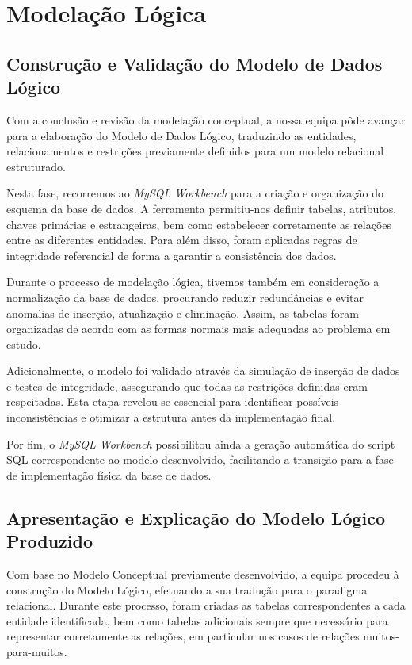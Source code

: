\documentclass[12pt,a4paper]{article}
\begin{document}
\section{Modelação Lógica}

\subsection{Construção e Validação do Modelo de Dados Lógico}
Com a conclusão e revisão da modelação conceptual, a nossa equipa pôde avançar para a elaboração do Modelo de Dados Lógico, traduzindo as entidades, relacionamentos e restrições previamente definidos para um modelo relacional estruturado.

Nesta fase, recorremos ao \textit{MySQL Workbench} para a criação e organização do esquema da base de dados. A ferramenta permitiu-nos definir tabelas, atributos, chaves primárias e estrangeiras, bem como estabelecer corretamente as relações entre as diferentes entidades. Para além disso, foram aplicadas regras de integridade referencial de forma a garantir a consistência dos dados.

Durante o processo de modelação lógica, tivemos também em consideração a normalização da base de dados, procurando reduzir redundâncias e evitar anomalias de inserção, atualização e eliminação. Assim, as tabelas foram organizadas de acordo com as formas normais mais adequadas ao problema em estudo.

Adicionalmente, o modelo foi validado através da simulação de inserção de dados e testes de integridade, assegurando que todas as restrições definidas eram respeitadas. Esta etapa revelou-se essencial para identificar possíveis inconsistências e otimizar a estrutura antes da implementação final.

Por fim, o \textit{MySQL Workbench} possibilitou ainda a geração automática do script SQL correspondente ao modelo desenvolvido, facilitando a transição para a fase de implementação física da base de dados.


\subsection{Apresentação e Explicação do Modelo Lógico Produzido}

Com base no Modelo Conceptual previamente desenvolvido, a equipa procedeu à construção do Modelo Lógico, efetuando a sua tradução para o paradigma relacional. Durante este processo, foram criadas as tabelas correspondentes a cada entidade identificada, bem como tabelas adicionais sempre que necessário para representar corretamente as relações, em particular nos casos de relações muitos-para-muitos.
\end{document}

